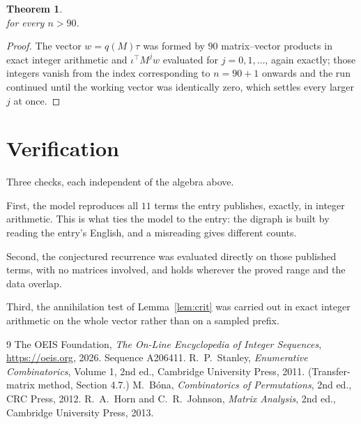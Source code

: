 \documentclass[11pt,a4paper]{article}
\theoremstyle{plain}
\newtheorem{theorem}{Theorem}
\theoremstyle{definition}
\begin{document}
\begin{theorem}
\[\]
for every $n>90$.
\end{theorem}

\begin{proof}
The vector $w=q(M)\tau$ was formed by $90$ matrix--vector products in exact integer
arithmetic and $\iota^{\!\top}M^{j}w$ evaluated for $j=0,1,\dots$, again exactly; those
integers vanish from the index corresponding to $n=90+1$ onwards and the run continued
until the working vector was identically zero, which settles every larger $j$ at once.
\end{proof}

\section{Verification}

Three checks, each independent of the algebra above.

First, the model reproduces all $11$ terms the entry publishes, exactly, in integer
arithmetic. This is what ties the model to the entry: the digraph is built by reading the
entry's English, and a misreading gives different counts.

Second, the conjectured recurrence was evaluated directly on those published terms, with no
matrices involved, and holds wherever the proved range and the data overlap.

Third, the annihilation test of Lemma~\ref{lem:crit} was carried out in exact integer
arithmetic on the whole vector rather than on a sampled prefix.

\begin{thebibliography}{9}
 The OEIS Foundation, \emph{The On-Line Encyclopedia of Integer
Sequences}, \url{https://oeis.org}, 2026. Sequence A206411.
 R.~P.~Stanley, \emph{Enumerative Combinatorics}, Volume 1, 2nd ed.,
Cambridge University Press, 2011. (Transfer-matrix method, Section 4.7.)
 M.~B\'ona, \emph{Combinatorics of Permutations}, 2nd ed., CRC
Press, 2012.
 R.~A.~Horn and C.~R.~Johnson, \emph{Matrix Analysis}, 2nd ed., Cambridge
University Press, 2013.
\end{thebibliography}
\end{document}
